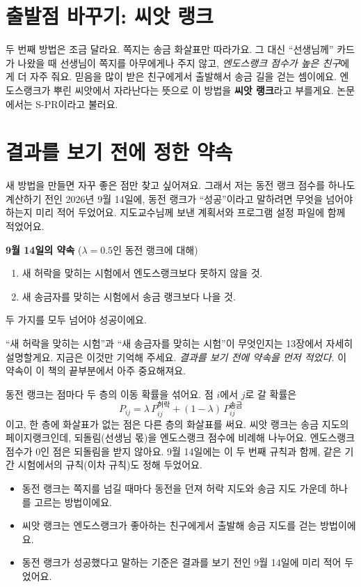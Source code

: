 \section{출발점 바꾸기: 씨앗 랭크}

두 번째 방법은 조금 달라요.
쪽지는 송금 화살표만 따라가요.
그 대신 “선생님께” 카드가 나왔을 때 선생님이 쪽지를 아무에게나 주지 않고,
\emph{엔도스랭크 점수가 높은 친구}에게 더 자주 줘요.
믿음을 많이 받은 친구에게서 출발해서 송금 길을 걷는 셈이에요.
엔도스랭크가 뿌린 씨앗에서 자라난다는 뜻으로 이 방법을 \textbf{씨앗 랭크}라고 부를게요.
논문에서는 S-PR이라고 불러요.

\section{결과를 보기 전에 정한 약속}

새 방법을 만들면 자꾸 좋은 점만 찾고 싶어져요.
그래서 저는 동전 랭크 점수를 하나도 계산하기 전인 2026년 9월 14일에,
동전 랭크가 “성공”이라고 말하려면 무엇을 넘어야 하는지 미리 적어 두었어요.
지도교수님께 보낸 계획서와 프로그램 설정 파일에 함께 적었어요.

\begin{center}
\begin{tcolorbox}[colback=white, colframe=inkblue, boxrule=0.8pt, arc=2mm, width=0.92\linewidth]
\small
\textbf{9월 14일의 약속} \quad ($\lambda = 0.5$인 동전 랭크에 대해)
\begin{enumerate}
\item 새 허락을 맞히는 시험에서 엔도스랭크보다 못하지 않을 것.
\item 새 송금자를 맞히는 시험에서 송금 랭크보다 나을 것.
\end{enumerate}
두 가지를 모두 넘어야 성공이에요.
\end{tcolorbox}
\end{center}

“새 허락을 맞히는 시험”과 “새 송금자를 맞히는 시험”이 무엇인지는 13장에서 자세히 설명할게요.
지금은 이것만 기억해 주세요.
\emph{결과를 보기 전에 약속을 먼저 적었다.}
이 약속이 이 책의 끝부분에서 아주 중요해져요.

\begin{deeper}[진짜 정의]
동전 랭크는 점마다 두 층의 이동 확률을 섞어요. 점 $i$에서 $j$로 갈 확률은
\[
P_{ij} = \lambda\, P^{\text{허락}}_{ij} + (1-\lambda)\, P^{\text{송금}}_{ij}
\]
이고, 한 층에 화살표가 없는 점은 다른 층의 화살표를 써요.
씨앗 랭크는 송금 지도의 페이지랭크인데, 되돌림(선생님 몫)을 엔도스랭크 점수에 비례해 나누어요.
엔도스랭크 점수가 0인 점은 되돌림을 받지 않아요.
9월 14일에는 이 두 번째 규칙과 함께, 같은 기간 시험에서의 규칙(이차 규칙)도 정해 두었어요.
\end{deeper}

\begin{learned}
\begin{itemize}
\item 동전 랭크는 쪽지를 넘길 때마다 동전을 던져 허락 지도와 송금 지도 가운데 하나를 고르는 방법이에요.
\item 씨앗 랭크는 엔도스랭크가 좋아하는 친구에게서 출발해 송금 지도를 걷는 방법이에요.
\item 동전 랭크가 성공했다고 말하는 기준은 결과를 보기 전인 9월 14일에 미리 적어 두었어요.
\end{itemize}
\end{learned}
